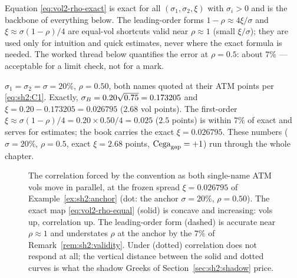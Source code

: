 \begin{remark}[Validity]\label{rem:sh2:validity}
Equation \eqref{eq:vol2-rho-exact} is exact for all
$(\sigma_1, \sigma_2, \xi)$ with $\sigma_i > 0$ and is the backbone of
everything below. The leading-order forms $1 - \rho \approx 4\xi/\sigma$
and $\xi \approx \sigma(1 - \rho)/4$ are equal-vol shortcuts valid near
$\rho \approx 1$ (small $\xi/\sigma$); they are used only for intuition and
quick estimates, never where the exact formula is needed. The worked
thread below quantifies the error at $\rho = 0.5$: about $7\%$ ---
acceptable for a limit check, not for a mark.
\end{remark}

\begin{example}\label{ex:sh2:anchor}
$\sigma_1 = \sigma_2 = \sigma = 20\%$, $\rho = 0.50$, both names quoted at
their ATM points per \eqref{eq:sh2:C1}. Exactly,
$\sigma_B = 0.20\sqrt{0.75} = 0.173205$ and
$\xi = 0.20 - 0.173205 = 0.026795$ ($2.68$ vol points). The first-order
$\xi \approx \sigma(1 - \rho)/4 = 0.20 \times 0.50 / 4 = 0.025$
($2.5$ points) is within $7\%$ of exact and serves for estimates; the
book carries the exact $\xi = 0.026795$. These numbers ($\sigma = 20\%$,
$\rho = 0.5$, exact $\xi = 2.68$ points, $\mathrm{Cega}_{\mathrm{gap}} = +1$) run through the whole
chapter.
\end{example}

\begin{figure}[ht]
\centering
{}
\caption{The correlation forced by the \stickycvc{} convention as both
single-name ATM vols move in parallel, at the frozen spread
$\xi = 0.026795$ of Example~\ref{ex:sh2:anchor} (dot: the anchor
$\sigma = 20\%$, $\rho = 0.50$). The exact map
\eqref{eq:vol2-rho-equal} (solid) is concave and increasing: vols up,
correlation up. The leading-order form (dashed) is accurate near
$\rho \approx 1$ and understates $\rho$ at the anchor by the $7\%$ of
Remark~\ref{rem:sh2:validity}. Under \stickyrho{} (dotted) correlation does
not respond at all; the vertical distance between the solid and dotted
curves is what the shadow Greeks of
Section~\ref{sec:sh2:shadow} price.}
\label{fig:sh2:rho-of-sigma}
\end{figure}

